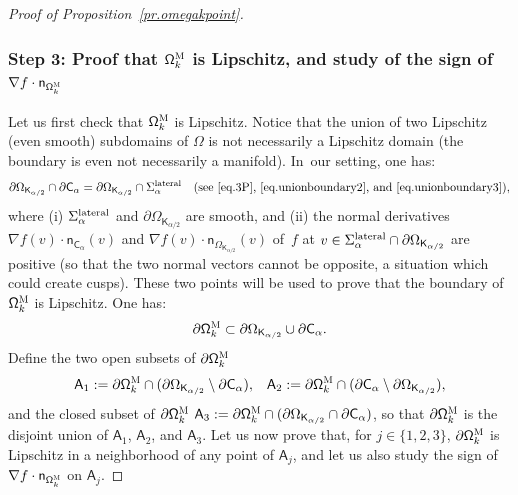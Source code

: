 \documentclass[10pt]{amsart}
\let\pa\partial
\theoremstyle{plain}
\theoremstyle{definition}
\begin{document}
\begin{proof}[Proof of Proposition~\ref{pr.omegakpoint}]
\subsubsection*{Step 3: Proof that $\mathsf \Omega_k^{\textsc{M}}$ is
Lipschitz, and study of the sign of $\nabla f\cdot \mathsf n _{\mathsf \Omega_k^{\textsc{M}}}$}
Let us first check that $\mathsf \Omega_k^{\textsc{M}}$ is
Lipschitz. Notice that the union of two Lipschitz (even smooth)
subdomains of $\Omega$ is not necessarily a Lipschitz domain (the
boundary is even not necessarily a manifold). In~our setting, one has:
\[
\partial \Omega_{\mathsf K_{\alpha/2}}\cap \pa \mathsf
C_\alpha=\partial \Omega_{\mathsf K_{\alpha/2}} \cap
\Sigma_\alpha^{\textup{lateral}} \quad\text{(see~\eqref{eq.3P},~\eqref{eq.unionboundary2},
and~\eqref{eq.unionboundary3})},
\]
where (i) $\Sigma_\alpha^{\textup{lateral}}$ and $\partial \Omega_{\mathsf K_{\alpha/2}}$ are smooth, and (ii) the normal derivatives $\nabla f(v)\cdot \mathsf n_{\mathsf C_\alpha}(v)$ and $\nabla f(v)\cdot \mathsf n_{ \Omega_{\mathsf K_{\alpha/2}}}(v)$ of~$f$ at $v\in \Sigma_\alpha^{\textup{lateral}}\cap \partial \Omega_{\mathsf K_{\alpha/2}}$ are positive (so that the two normal vectors cannot be opposite, a situation which could create cusps). These two points will be used to prove that the boundary of $\mathsf \Omega_k^{\textsc{M}}$ is Lipschitz.
One has:
\begin{equation}\label{eq.=pa-domk-union}
\pa \mathsf \Omega_k^{\textsc{M}} \subset \partial \Omega_{\mathsf K_{\alpha/2}} \cup \pa \mathsf C_\alpha.
\end{equation}
Define the two open subsets of $\pa \mathsf \Omega_k^{\textsc{M}}$
\begin{equation}\label{eq.A1A2}
\mathsf A_1:=\pa \mathsf \Omega_k^{\textsc{M}} \cap (\partial \Omega_{\mathsf K_{\alpha/2}}\setminus \pa \mathsf C_\alpha), \ \ \, \mathsf A_2:= \pa \mathsf \Omega_k^{\textsc{M}}\cap (\pa \mathsf C_\alpha\setminus\partial \Omega_{\mathsf K_{\alpha/2}}),
\end{equation}
and the closed subset of $\pa \mathsf \Omega_k^{\textsc{M}}$
$\mathsf A_3:= \pa \mathsf \Omega_k^{\textsc{M}} \cap (\partial \Omega_{\mathsf K_{\alpha/2}}\cap \pa \mathsf C_\alpha)$,
so that $\pa \mathsf \Omega_k^{\textsc{M}}$ is the disjoint union of
$\mathsf A_1$, $\mathsf A_2$, and $\mathsf A_3$. Let us now prove
that, for $j\in \{1,2,3\}$, $\pa \mathsf \Omega_k^{\textsc{M}}$ is
Lipschitz in a neighborhood of any point of $\mathsf A_j$, and let us
also study the sign of $\nabla f\cdot \mathsf n_{ \mathsf
\Omega_k^{\textsc{M}}}$ on $\mathsf A_j$.


\end{proof}
\end{document}
